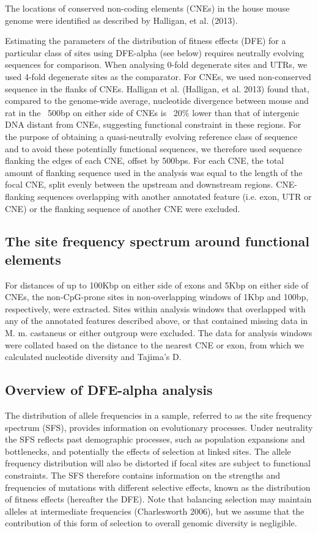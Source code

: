 The locations of conserved non-coding elements (CNEs) in the house mouse genome were identified as described by Halligan, et al. (2013). 

Estimating the parameters of the distribution of fitness effects (DFE) for a particular class of sites using DFE-alpha (see below) requires neutrally evolving sequences for comparison. When analysing 0-fold degenerate sites and UTRs, we used 4-fold degenerate sites as the comparator. For CNEs, we used non-conserved sequence in the flanks of CNEs. Halligan et al. (Halligan, et al. 2013) found that, compared to the genome-wide average, nucleotide divergence between mouse and rat in the ~500bp on either side of CNEs is ~20\% lower than that of intergenic DNA distant from CNEs, suggesting functional constraint in these regions. For the purpose of obtaining a quasi-neutrally evolving reference class of sequence and to avoid these potentially functional sequences, we therefore used sequence flanking the edges of each CNE, offset by 500bps. For each CNE, the total amount of flanking sequence used in the analysis was equal to the length of the focal CNE, split evenly between the upstream and downstream regions. CNE-flanking sequences overlapping with another annotated feature (i.e. exon, UTR or CNE) or the flanking sequence of another CNE were excluded.

\subsection{The site frequency spectrum around functional elements}
 
For distances of up to 100Kbp on either side of exons and 5Kbp on either side of CNEs, the non-CpG-prone sites in non-overlapping windows of 1Kbp and 100bp, respectively, were extracted. Sites within analysis windows that overlapped with any of the annotated features described above, or that contained missing data in M. m. castaneus or either outgroup were excluded. The data for analysis windows were collated based on the distance to the nearest CNE or exon, from which we calculated nucleotide diversity and Tajima’s D.

\subsection{Overview of DFE-alpha analysis}

	The distribution of allele frequencies in a sample, referred to as the site frequency spectrum (SFS), provides information on evolutionary processes. Under neutrality the SFS reflects past demographic processes, such as population expansions and bottlenecks, and potentially the effects of selection at linked sites. The allele frequency distribution will also be distorted if focal sites are subject to functional constraints. The SFS therefore contains information on the strengths and frequencies of mutations with different selective effects, known as the distribution of fitness effects (hereafter the DFE). Note that balancing selection may maintain alleles at intermediate frequencies (Charlesworth 2006), but we assume that the contribution of this form of selection to overall genomic diversity is negligible.


